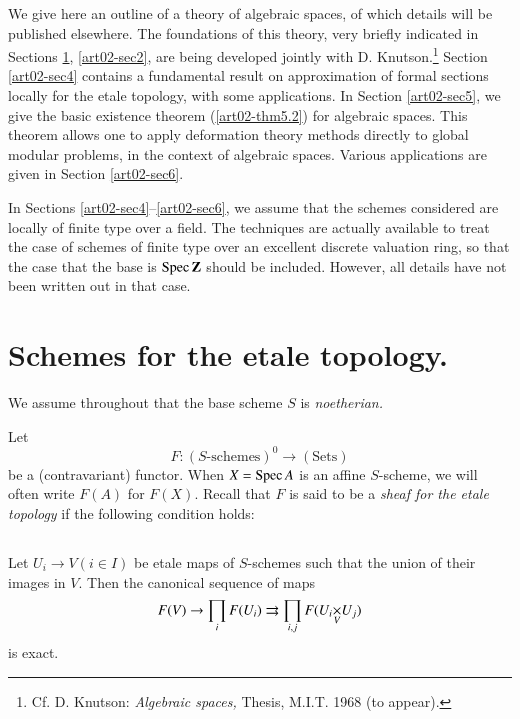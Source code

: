 We give here an outline of a theory of algebraic spaces, of which details will be published elsewhere. The foundations of this theory, very briefly indicated in Sections \ref{art02-sec1}, \ref{art02-sec2}, are being developed jointly with D. Knutson.\footnote{Cf. D. Knutson: {\em Algebraic spaces,} Thesis, M.I.T. 1968 (to appear).} Section \ref{art02-sec4} contains a fundamental result on approximation of formal sections locally for the etale topology, with some applications. In Section \ref{art02-sec5}, we give the basic existence theorem (\ref{art02-thm5.2}) for algebraic spaces. This theorem allows one to apply deformation theory methods directly to global modular problems, in the context of algebraic spaces. Various applications are given in Section \ref{art02-sec6}.

In Sections \ref{art02-sec4}--\ref{art02-sec6}, we assume that the schemes considered are locally of finite type over a field. The techniques are actually available to treat the case of schemes of finite type over an excellent discrete valuation ring, so that the case that the base is $\operatorname{Spec} \mathbf{Z}$ should be included. However, all details have not been written out in that case.

\section{Schemes for the etale topology.}\label{art02-sec1}

We assume throughout that the base scheme $S$ is {\em noetherian.}

Let
\begin{equation*}
F:(S\text{-schemes})^{0}\to (\text{Sets})\tag{1.1}\label{art02-eq1.1}
\end{equation*}
be a (contravariant) functor. When $X=\operatorname{Spec} A$ is an affine $S$-scheme, we will often write $F(A)$ for $F(X)$. Recall that $F$ is said to be a {\em sheaf for the etale topology} if the following condition holds:

\setcounter{subsection}{1}
\subsection{}\label{art02-sec1.2}

Let $U_{i}\to V(i\in I)$ be etale maps of $S$-schemes such that the union of their images in $V$. Then the canonical sequence of maps 
$$
F(V)\to \prod\limits_{i} F(U_{i})\rightrightarrows \prod\limits_{i,j}F(\fprod{U_{i}}{U_{j}}{V})
$$\pageoriginale
is exact.

